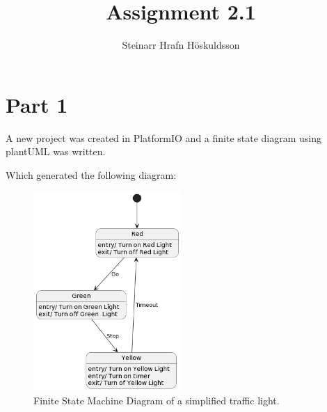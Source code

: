 \documentclass{article}
\title{Assignment 2.1}
\author{Steinarr Hrafn Höskuldsson}
\newcommand{\mycomment}[1]{}
\begin{document}
\pagestyle{firststyle}
{\let\newpage\relax\maketitle}

\mycomment{
\begin{figure}[h]
    \centering
    \texttt{[image: LAB3/Basic1.png]}
    \caption{"Switch test" Breadboard set up}
    \label{fig:Switch_test}
\end{figure}



}

\section*{Part 1}
A new project was created in PlatformIO and a finite state diagram using plantUML was written. 



Which generated the following diagram:
\begin{figure}[h]
    \centering
    \includegraphics[width=0.5\textwidth]{Assignment3_1StateBehaviour/docs/diagrams/fsm2.png}
    \caption{Finite State Machine Diagram of a simplified traffic light.}
\end{figure}
\end{document}
